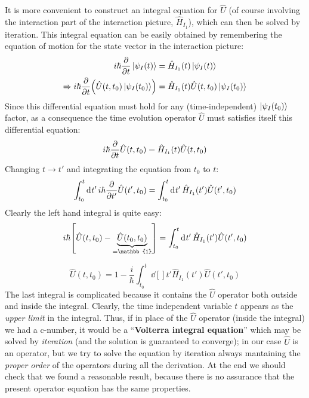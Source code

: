 \documentclass[../main/main.tex]{subfiles}
\begin{document}
It is more convenient to construct an integral equation for \( \hat{U}  \) (of course involving the interaction part of the interaction picture, \( \hat{H}_{I_1}  \)), which can then be solved by iteration.
This integral equation can be easily obtained by remembering the equation of motion for the state vector in the interaction picture:
\begin{equation*}
\begin{split}
   i \hbar \pdv{}{t} \ket{\psi _I (t)} &= \hat{H}_{I_1} (t)  \ket{\psi _I (t)}  \\
   \Rightarrow
   i \hbar \pdv{}{t} \qty( \hat{U} (t,t_0)   \ket{\psi _I (t_0)})
   &= \hat{H}_{I_1} (t) \hat{U} (t,t_0) \ket{\psi _I (t_0)}
\end{split}
\end{equation*}
Since this differential equation must hold for any (time-independent) \( \ket{\psi _I (t_0)} \) factor, as a consequence the time evolution operator \( \hat{U}  \) must satisfies itself this differential equation:
\begin{equation*}
  i \hbar  \pdv{}{t} \hat{U} (t,t_0) = \hat{H}_{I_1} (t) \hat{U} (t,t_0)
\end{equation*}
Changing \( t \rightarrow t' \) and integrating the equation from \( t_0 \) to \( t \):
\begin{equation*}
  \int_{t_0}^{t} \dd[]{t'} i \hbar \pdv{}{t'} \hat{U} (t',t_0)
  = \int_{t_0}^{t} \dd[]{t'} \hat{H}_{I_1} (t') \hat{U} (t',t_0)
\end{equation*}
Clearly the left hand integral is quite easy:
\begin{equation*}
  i \hbar \qty[ \hat{U} (t,t_0) - \underbrace{\hat{U} (t_0,t_0)}_{=\mathbb{1}}   ]
  =  \int_{t_0}^{t} \dd[]{t'} \hat{H}_{I_1} (t') \hat{U} (t',t_0)
\end{equation*}

\begin{equation}
  \hat{U} (t,t_0) = 1 - \frac{i}{\hbar } \int_{t_0}^{t} \dd[]{t'} \hat{H}_{I_1} (t') \hat{U} (t',t_0)
\end{equation}
The last integral is complicated because it contains the \( \hat{U}  \) operator both outside and inside the integral.
Clearly, the time independent variable \( t \) appears as the \emph{upper limit} in the integral. Thus, if in place of the \( \hat{U}  \) operator (inside the integral) we had a c-number, it would be a “\textbf{Volterra integral equation}” which may be solved by \emph{iteration} (and the solution is guaranteed to converge); in our case \( \hat{U}  \) is an operator, but we try to solve the equation by iteration always mantaining the \emph{proper order} of the operators during all the derivation. At the end we should check that we found a reasonable result, because there is no assurance that the present operator equation has the same properties.
\end{document}
